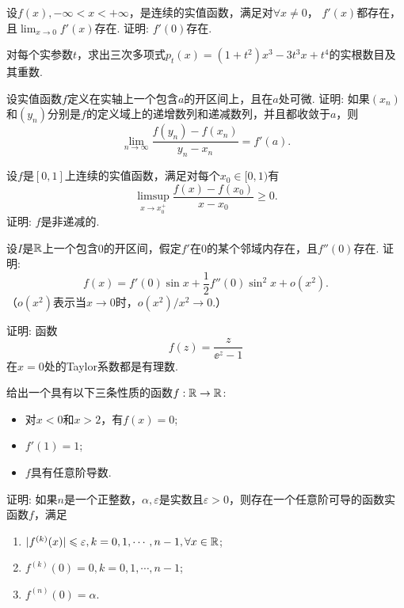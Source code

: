 \begin{example}
  设$f(x),-\infty<x<+\infty$，是连续的实值函数，满足对$\forall x\ne0$， $f'(x)$都存在，且$\lim_{x\to0}f'(x)$存在. 证明: $f'(0)$存在.
\end{example}

\begin{example}
  对每个实参数$t$，求出三次多项式$p_t(x)=(1+t^2)x^3-3t^3x+t^4$的实根数目及其重数.
\end{example}

\begin{example}
  设实值函数$f$定义在实轴上一个包含$a$的开区间上，且在$a$处可微. 证明: 如果$(x_n)$和$(y_n)$分别是$f$的定义域上的递增数列和递减数列，并且都收敛于$a$，则
  \[ \lim_{n\to\infty}\frac{f(y_n)-f(x_n)}{y_n-x_n} = f'(a). \]
\end{example}

\begin{example}
  设$f$是$[0,1]$上连续的实值函数，满足对每个$x_0\in[0,1)$有
  \[ \limsup_{x\to x_0^+} \frac{f(x)-f(x_0)}{x-x_0}\ge0. \]
  证明: $f$是非递减的.
\end{example}

\begin{example}
  设$I$是$\mathbb R$上一个包含0的开区间，假定$f'$在0的某个邻域内存在，且$f''(0)$存在. 证明:
  \[ f(x)=f'(0)\sin x+\frac12f''(0)\sin^2x+o(x^2). \]
  （$o(x^2)$表示当$x\to0$时，$o(x^2)/x^2\to0$.）
\end{example}

\begin{example}
  证明: 函数
  \[f(z)=\frac z{\ee^z-1}\]
  在$x=0$处的Taylor系数都是有理数.
\end{example}

\begin{example}
  给出一个具有以下三条性质的函数$f:\mathbb R\to\mathbb R$:
  \begin{itemize}
    \item 对$x<0$和$x>2$，有$f(x)=0$;
    \item $f'(1)=1$;
    \item $f$具有任意阶导数.
  \end{itemize}
\end{example}

\begin{example}
  证明: 如果$n$是一个正整数，$\alpha,\varepsilon$是实数且$\varepsilon>0$，则存在一个任意阶可导的函数实函数$f$，满足
  \begin{enumerate}
    \item $|f^{(k)}(x)|\leqslant \varepsilon,k=0,1,\cdots,n-1,\forall x\in\mathbb R$;
    \item $f^{(k)}(0)=0,k=0,1,\cdots,n-1$;
    \item $f^{(n)}(0)=\alpha$.
  \end{enumerate}
\end{example}

